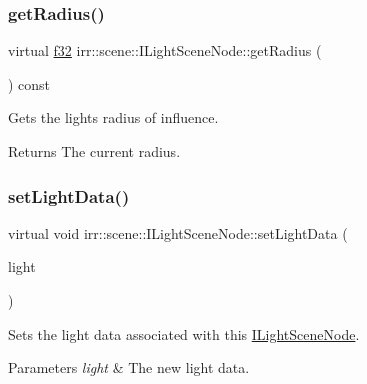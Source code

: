 \subsubsection{\texorpdfstring{get\+Radius()}{getRadius()}}
{\footnotesize\ttfamily virtual \hyperlink{namespaceirr_a0277be98d67dc26ff93b1a6a1d086b07}{f32} irr\+::scene\+::\+I\+Light\+Scene\+Node\+::get\+Radius (\begin{DoxyParamCaption}{ }\end{DoxyParamCaption}) const\hspace{0.3cm}{\ttfamily [pure virtual]}}



Gets the light\textquotesingle{}s radius of influence. 

\begin{DoxyReturn}{Returns}
The current radius. 
\end{DoxyReturn}
\mbox{\label{classirr_1_1scene_1_1ILightSceneNode_acf74ff3400a26ae31eb96b9c479e62d5}} 
\subsubsection{\texorpdfstring{set\+Light\+Data()}{setLightData()}}
{\footnotesize\ttfamily virtual void irr\+::scene\+::\+I\+Light\+Scene\+Node\+::set\+Light\+Data (\begin{DoxyParamCaption}\item[{const \hyperlink{structirr_1_1video_1_1SLight}{video\+::\+S\+Light} \&}]{light }\end{DoxyParamCaption})\hspace{0.3cm}{\ttfamily [pure virtual]}}



Sets the light data associated with this \hyperlink{classirr_1_1scene_1_1ILightSceneNode}{I\+Light\+Scene\+Node}. 


\begin{DoxyParams}{Parameters}
{\em light} & The new light data. \\
\hline
\end{DoxyParams}
\mbox{\label{classirr_1_1scene_1_1ILightSceneNode_a18b3c0ba831bdc9166db341a35701c9b}} 
